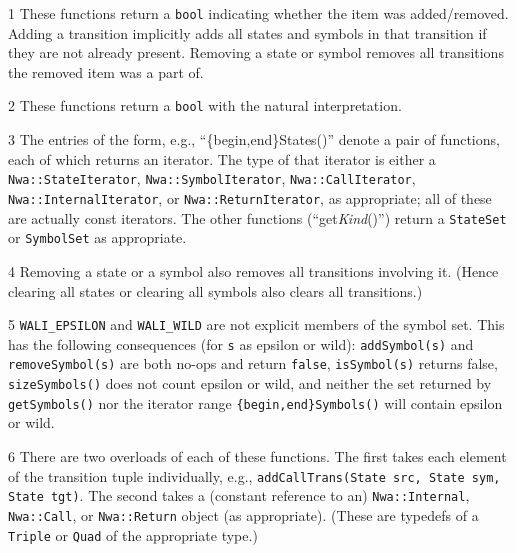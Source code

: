 \begin{sidewaystable}
\begin{threeparttable}
\begin{tabular}{p{0.55in}p{1.40in}p{1.45in}p{1.2in}p{1.12in}p{1.05in}p{1.35in}}
\hline
\end{tabular}
\begin{tablenotes}
  \item[1] These functions return a \texttt{bool} indicating whether the item
    was added/removed. Adding a transition implicitly adds all
    states and symbols in that transition if they are not already present.
    Removing a state or symbol removes all transitions the removed item was a
    part of.
  \item[2] These functions return a \texttt{bool} with the natural
    interpretation.
  \item[3] The entries of the form, e.g., ``\{begin,end\}States()'' denote a pair
    of functions, each of which returns an iterator. The type of that iterator
    is either a \texttt{Nwa::StateIterator},
    \texttt{Nwa::SymbolIterator}, \texttt{Nwa::CallIterator},
    \texttt{Nwa::InternalIterator}, or \texttt{Nwa::ReturnIterator}, as appropriate; all of these are
    actually const iterators. The other functions (``get\textit{Kind}()'')
    return a \texttt{StateSet} or \texttt{SymbolSet} as appropriate.
  \item[4] Removing a state or a symbol also removes all transitions
    involving it. (Hence clearing all states or clearing all symbols also
    clears all transitions.)
  \item[5] \texttt{WALI\_EPSILON} and \texttt{WALI\_WILD} are not explicit
    members of the symbol set. This has the following consequences (for
    \texttt{s} as epsilon or wild): \texttt{addSymbol(s)} and
    \texttt{removeSymbol(s)} are both no-ops and return \texttt{false},
    \texttt{isSymbol(s)} returns false, \texttt{sizeSymbols()} does not count
    epsilon or wild, and neither the set returned by \texttt{getSymbols()}
    nor the iterator range \texttt{\{begin,end\}Symbols()} will contain
    epsilon or wild.
  \item[6] There are two overloads of each of these functions. The first
    takes each element of the transition tuple individually,
    e.g., \texttt{addCallTrans(State src, State sym, State tgt)}. The
    second takes a (constant reference to an) \texttt{Nwa::Internal},
    \texttt{Nwa::Call}, or \texttt{Nwa::Return} object (as
    appropriate). (These are typedefs of a \texttt{Triple} or \texttt{Quad}
    of the appropriate type.)
\end{tablenotes}
\end{threeparttable}
\end{sidewaystable}




